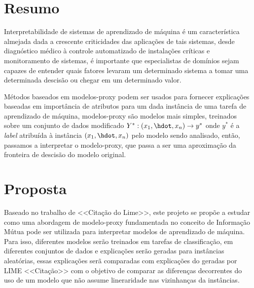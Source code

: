 \documentclass{article}
\begin{document}
\section*{Resumo}
\label{sec:resumo}
Interpretabilidade de sistemas de aprendizado de máquina é um
característica almejada dada a crescente criticidades das aplicações
de tais sistemas, desde diagnóstico médico à controle automatizado
de instalações críticas e monitoramento de sistemas, é importante que
especialistas de domínios sejam capazes de entender quais fatores
levaram um determinado sistema a tomar uma determinada descisão ou
chegar em um determinado valor.

Métodos baseados em modelos-proxy podem ser usados para fornecer
explicações baseadas em importância de atributos para um dada instância
de uma tarefa de aprendizado de máquina, modelos-proxy são modelos
mais simples, treinados sobre um conjunto de dados modificado $Y^*:
(x_1,\hdot,x_n) \rightarrow y^*$
onde $y^*$ é a \textit{label} atribuída à instância $(x_1,\hdot,x_n)$ pelo
modelo sendo analisado, então, passamos a interpretar o modelo-proxy, que passa
a ser uma aproximação da fronteira de descisão do modelo original.

\section*{Proposta}
\label{sec:proposta}

Baseado no trabalho de <<Citação do Lime>>, este projeto se propõe
a estudar como uma abordagem de modelo-proxy fundamentada no conceito
de Informação Mútua pode ser utilizada para interpretar modelos de aprendizado
de máquina. Para isso, diferentes modelos serão treinados em tarefas de
classificação, em diferentes conjuntos de dados e explicações serão geradas
para instâncias aleatórias, essas explicações serã comparadas com explicações do
geradas por LIME <<Citação>> com o objetivo de comparar as diferenças
decorrentes do uso de um modelo que não assume lineraridade nas vizinhanças
da instâncias.
\end{document}
